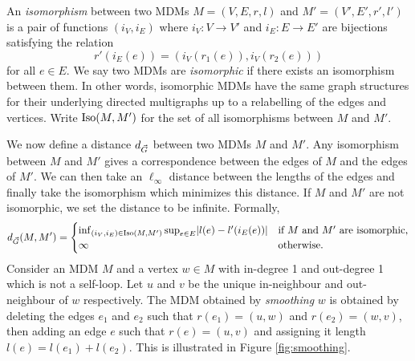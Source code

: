 An \emph{isomorphism} between two MDMs $M = (V, E, r, l)$ and $M' = (V', E', r', l')$ is a pair of functions $(i_V, i_E)$ where $i_V: V \to V'$ and $i_E: E \to E'$ are bijections satisfying the relation
\begin{equation*}
    r'(i_E(e)) = (i_V(r_1(e)), i_V(r_2(e)))
\end{equation*}
for all $e \in E$. We say two MDMs are \emph{isomorphic} if there exists an isomorphism between them. In other words, isomorphic MDMs have the same graph structures for their underlying directed multigraphs up to a relabelling of the edges and vertices. Write $\operatorname{Iso}(M, M')$ for the set of all isomorphisms between $M$ and $M'$.

We now define a distance $d_{\vec{G}}$ between two MDMs $M$ and $M'$.  Any isomorphism between $M$ and $M'$ gives a correspondence between the edges of $M$ and the edges of $M'$. We can then take an $\ell_{\infty}$ distance between the lengths of the edges and finally take the isomorphism which minimizes this distance. If $M$ and $M'$ are not isomorphic, we set the distance to be infinite. Formally,
\begin{equation*}
    d_{\vec{G}}(M, M') = \begin{cases}
        \inf_{(i_V, i_E) \in \operatorname{Iso}(M, M')} \sup_{e \in E} \lvert l(e) - l'(i_E(e))\rvert & \text{if $M$ and $M'$ are isomorphic,} \\
        \infty & \text{otherwise.}
    \end{cases}
\end{equation*}
Consider an MDM $M$ and a vertex $w \in M$ with in-degree 1 and out-degree 1 which is not a self-loop. Let $u$ and $v$ be the unique in-neighbour and out-neighbour of $w$ respectively. The MDM obtained by \emph{smoothing} $w$ is obtained by deleting the edges $e_1$ and $e_2$ such that $r(e_1) = (u, w)$ and $r(e_2) = (w, v)$, then adding an edge $e$ such that $r(e) = (u, v)$ and assigning it length $l(e) = l(e_1) + l(e_2)$. This is illustrated in Figure \ref{fig:smoothing}. 
